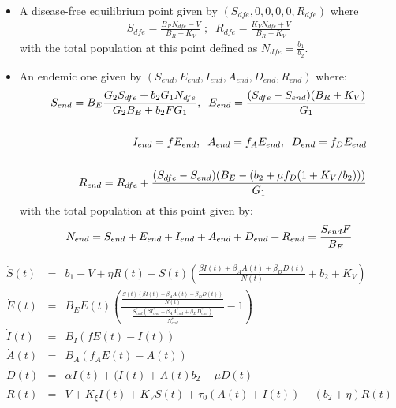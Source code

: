 \documentclass[10pt,a4paper]{article}
\begin{document}
\begin{itemize}
	\item 	A disease-free equilibrium point given by $(S_{dfe},0,0,0,0,R_{dfe})$ where
	\begin{eqnarray}
	S_{dfe}=\frac{B_R N_{dfe}-V}{B_R+K_V}\; ; \;\; R_{dfe}=\frac{K_V N_{dfe}+V}{B_R+K_V}\label{dfe-cont}
	\end{eqnarray}
	with  the total population at this point defined as $N_{dfe}=\frac{b_1}{b_2}$.
	\item
	An endemic one given by $(S_{end},E_{end},I_{end},A_{end},D_{end},R_{end})$ where:
	\begin{eqnarray}
	S_{end}=B_E\frac{G_2 S_{dfe}+b_2 G_1 N_{dfe}}{G_2 B_E+ b_2 F G_1},\;\; E_{end}=\frac{(S_{dfe}-S_{end})(B_R+K_V)}{G_1}\notag\\\notag\\
	I_{end}=f E_{end},\;\;A_{end}=f_A E_{end},\;\; D_{end}= f_D E_{end}\notag\\\notag\\
	R_{end}=R_{dfe}+\frac{(S_{dfe}-S_{end})(B_E-(b_2+\mu f_D (1+K_V/b_2)))}{G_1} \label{end-cont}
	\end{eqnarray}
	with the total population at this point given by:
	\begin{eqnarray}
	N_{end}=S_{end}+E_{end}+I_{end}+A_{end}+D_{end}+R_{end}=\frac{S_{end}F}{B_E}\notag
	\end{eqnarray}
\end{itemize}


\begin{eqnarray}	
\dot{S}(t)&=&b_1 -V+\eta R(t)-S(t)\left(\frac{\beta I(t)+\beta_A A(t)+\beta_D D(t)}{N(t)}+b_2+K_V\right)\label{eqcontS2}\\
\dot{E}(t)&=&B_E E(t)\left(\frac{\frac{S(t)\left(\beta I(t) +\beta_A A(t) +\beta_D D(t) \right)}{N(t)}}{\frac{S^*_{end}\left(\beta I^*_{end} +\beta_A A^*_{end} +\beta_D D^*_{end} \right)}{N^*_{end}}}-1\right)\\
\dot{I}(t)&=&B_I\left( f E(t)-I(t)\right)\\
\dot{A}(t)&=&B_A\left( f_A E(t)-A(t)\right)\\
\dot{D}(t)&=&\alpha I(t)+(I(t)+A(t)b_2-\mu D(t)\\
\dot{R}(t)&=& V+K_\xi I(t)+K_V S(t)+\tau_0 (A(t)+I(t))-(b_2+\eta)R(t)\label{eqcontR2}
\end{eqnarray}


\end{document}
